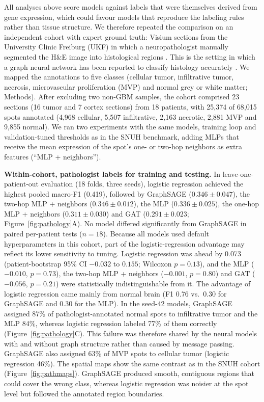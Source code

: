 \documentclass[11pt,letterpaper]{article}
\begin{document}
All analyses above score models against labels that were themselves derived from gene expression, which could favour models that reproduce the labeling rules rather than tissue structure. We therefore repeated the comparison on an independent cohort with expert ground truth: Visium sections from the University Clinic Freiburg (UKF) \cite{ravi2022} in which a neuropathologist manually segmented the H\&E image into histological regions \cite{ritter2025}. This is the setting in which a graph neural network has been reported to classify histology accurately \cite{ritter2025}. We mapped the annotations to five classes (cellular tumor, infiltrative tumor, necrosis, microvascular proliferation (MVP) and normal grey or white matter; Methods). After excluding two non-GBM samples, the cohort comprised 23 sections (16 tumor and 7 cortex sections) from 18 patients, with 25{,}374 of 68{,}015 spots annotated (4{,}968 cellular, 5{,}507 infiltrative, 2{,}163 necrotic, 2{,}881 MVP and 9{,}855 normal). We ran two experiments with the same models, training loop and validation-tuned thresholds as in the SNUH benchmark, adding MLPs that receive the mean expression of the spot's one- or two-hop neighbors as extra features (``MLP + neighbors'').

\textbf{Within-cohort, pathologist labels for training and testing.} In leave-one-patient-out evaluation (18 folds, three seeds), logistic regression achieved the highest pooled macro-F1 (0.419), followed by GraphSAGE ($0.346 \pm 0.047$), the two-hop MLP + neighbors ($0.346 \pm 0.012$), the MLP ($0.336 \pm 0.025$), the one-hop MLP + neighbors ($0.311 \pm 0.030$) and GAT ($0.291 \pm 0.023$; Figure~\ref{fig:pathology}A). No model differed significantly from GraphSAGE in paired per-patient tests ($n = 18$). Because all models used default hyperparameters in this cohort, part of the logistic-regression advantage may reflect its lower sensitivity to tuning. Logistic regression was ahead by 0.073 (patient-bootstrap 95\% CI $-0.032$ to $0.155$; Wilcoxon $p = 0.13$), and the MLP ($-0.010$, $p = 0.73$), the two-hop MLP + neighbors ($-0.001$, $p = 0.80$) and GAT ($-0.056$, $p = 0.21$) were statistically indistinguishable from it. The advantage of logistic regression came mainly from normal brain (F1 0.76 vs.\ 0.30 for GraphSAGE and 0.30 for the MLP). In the seed-42 models, GraphSAGE assigned 87\% of pathologist-annotated normal spots to infiltrative tumor and the MLP 84\%, whereas logistic regression labeled 77\% of them correctly (Figure~\ref{fig:pathology}C). This failure was therefore shared by the neural models with and without graph structure rather than caused by message passing. GraphSAGE also assigned 63\% of MVP spots to cellular tumor (logistic regression 46\%). The spatial maps show the same contrast as in the SNUH cohort (Figure~\ref{fig:pathmaps}). GraphSAGE produced smooth, contiguous regions that could cover the wrong class, whereas logistic regression was noisier at the spot level but followed the annotated region boundaries.
\end{document}
